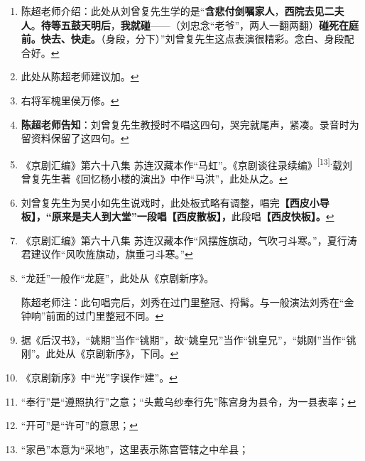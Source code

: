 \begin{enumerate}
\item
  \leavevmode\hypertarget{fn126}{}%
  陈超老师介绍：此处从刘曾复先生学的是``\textbf{含悲付剑嘱家人}，\textbf{西院去见二夫人}。\textbf{待等五鼓天明后}，\textbf{我就碰}------（刘忠念``老爷''，两人一翻两翻）\textbf{碰死在庭前。快去、快走。}（身段，分下）''刘曾复先生这点表演很精彩。念白、身段配合好。\protect\hyperlink{fnref126}{↩}
\item
  \leavevmode\hypertarget{fn127}{}%
  此处从陈超老师建议加。\protect\hyperlink{fnref127}{↩}
\item
  \leavevmode\hypertarget{fn128}{}%
  右将军槐里侯万修。\protect\hyperlink{fnref128}{↩}
\item
  \leavevmode\hypertarget{fn129}{}%
  \textbf{陈超老师告知}：刘曾复先生教授时不唱这四句，哭完就尾声，紧凑。录音时为留资料保留了这四句。\protect\hyperlink{fnref129}{↩}
\item
  \leavevmode\hypertarget{fn130}{}%
  《京剧汇编》第六十八集
  苏连汉藏本作``马虹''。《京剧谈往录续编》\textsuperscript{{[}13{]}.}载刘曾复先生著《回忆杨小楼的演出》中作``马洪''，此处从之。\protect\hyperlink{fnref130}{↩}
\item
  \leavevmode\hypertarget{fn131}{}%
  刘曾复先生为吴小如先生说戏时，此处板式略有调整，唱完\textbf{【西皮小导板】，``原来是夫人到大堂''一段唱【西皮散板】，}此段唱\textbf{【西皮快板】。}\protect\hyperlink{fnref131}{↩}
\item
  \leavevmode\hypertarget{fn132}{}%
  《京剧汇编》第六十八集
  苏连汉藏本作``风摆旌旗动，气吹刁斗寒。''，夏行涛君建议作``风吹旌旗动，旗垂刁斗寒。''\protect\hyperlink{fnref132}{↩}
\item
  \leavevmode\hypertarget{fn133}{}%
  ``龙廷''一般作``龙庭''，此处从《京剧新序》。

  陈超老师注：此句唱完后，刘秀在过门里整冠、捋髯。与一般演法刘秀在``金钟响''前面的过门里整冠不同。\protect\hyperlink{fnref133}{↩}
\item
  \leavevmode\hypertarget{fn134}{}%
  据《后汉书》，``姚期''当作``铫期''，故``姚皇兄''当作``铫皇兄''，``姚刚''当作``铫刚''。此处从《京剧新序》，下同。\protect\hyperlink{fnref134}{↩}
\item
  \leavevmode\hypertarget{fn135}{}%
  《京剧新序》中``光''字误作``建''。\protect\hyperlink{fnref135}{↩}
\item
  \leavevmode\hypertarget{fn136}{}%
  ``奉行''是``遵照执行''之意；``头戴乌纱奉行先''陈宫身为县令，为一县表率；\protect\hyperlink{fnref136}{↩}
\item
  \leavevmode\hypertarget{fn137}{}%
  ``开可''是``许可''的意思；\protect\hyperlink{fnref137}{↩}
\item
  \leavevmode\hypertarget{fn138}{}%
  ``家邑''本意为``采地''，这里表示陈宫管辖之中牟县；


\end{enumerate}
